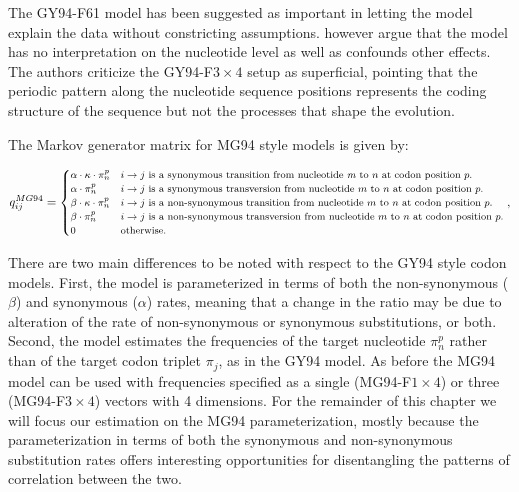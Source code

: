 The GY94-F61 model has been suggested as important in letting the model explain the data without constricting assumptions.
\citet{Rodrigue2008} however argue that the model has no interpretation on the nucleotide level as well as confounds other effects. 
The authors criticize the GY94-F$3\times4$ setup as superficial, pointing that the periodic pattern along the nucleotide sequence positions represents the coding structure of the sequence but not the processes that shape the evolution.

The Markov generator matrix for MG94 style models \citep{Muse1994} is given by:

\begin{equation}
\footnotesize{
q_{ij}^{MG94}=\begin{cases}
\alpha\cdot\kappa\cdot\pi_{n}^{p} & i\rightarrow j\text{ is a synonymous transition from nucleotide \textit{m} to \ensuremath{n} at codon position \ensuremath{p}.}\\
\alpha\cdot\pi_{n}^{p} & i\rightarrow j\text{ is a synonymous transversion from nucleotide \ensuremath{m} to \ensuremath{n} at codon position \ensuremath{p}.}\\
\beta\cdot\kappa\cdot\pi_{n}^{p} & i\rightarrow j\text{ is a non-synonymous transition from nucleotide \ensuremath{m} to \ensuremath{n} at codon position \ensuremath{p}.}\\
\beta\cdot\pi_{n}^{p} & i\rightarrow j\text{ is a non-synonymous transversion from nucleotide \ensuremath{m} to \ensuremath{n} at codon position \ensuremath{p}.}\\
0 & \text{otherwise.}
\end{cases},
} %
\label{eq:mg94}
\end{equation}

There are two main differences to be noted with respect to the GY94 style codon models.
First, the model is parameterized in terms of both the non-synonymous ($\beta$) and synonymous ($\alpha$) rates, meaning that a change in the ratio may be due to alteration of the rate of non-synonymous or synonymous substitutions, or both.
Second, the model estimates the frequencies of the target nucleotide $\pi_{n}^{p}$ rather than of the target codon triplet $\pi_{j}$, as in the GY94 model.
As before the MG94 model can be used with frequencies specified as a single (MG94-F$1\times4$) or three (MG94-F$3\times4$) vectors with 4 dimensions.
For the remainder of this chapter we will focus our estimation on the MG94 parameterization, mostly because the parameterization in terms of both the synonymous and non-synonymous substitution rates offers interesting opportunities for disentangling
the patterns of correlation between
the two.


